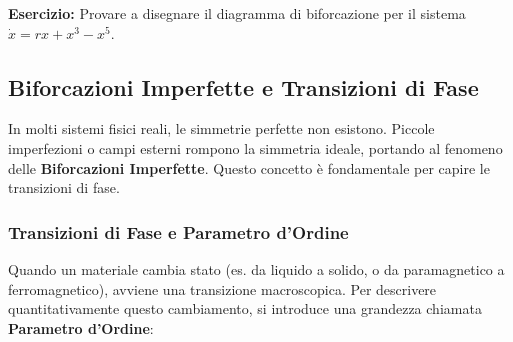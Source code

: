 \documentclass[openany]{book}
\theoremstyle{definition}
\theoremstyle{remark}
\begin{document}
\begin{center}
\end{center}

\textbf{Esercizio:} Provare a disegnare il diagramma di biforcazione per il sistema $\dot{x} = rx + x^3 - x^5$. 



\subsection{Biforcazioni Imperfette e Transizioni di Fase}

In molti sistemi fisici reali, le simmetrie perfette non esistono. Piccole imperfezioni o campi esterni rompono la simmetria ideale, portando al fenomeno delle \textbf{Biforcazioni Imperfette}. Questo concetto è fondamentale per capire le transizioni di fase.

\subsubsection*{Transizioni di Fase e Parametro d'Ordine}
Quando un materiale cambia stato (es. da liquido a solido, o da paramagnetico a ferromagnetico), avviene una transizione macroscopica. Per descrivere quantitativamente questo cambiamento, si introduce una grandezza chiamata \textbf{Parametro d'Ordine}:
\end{document}

